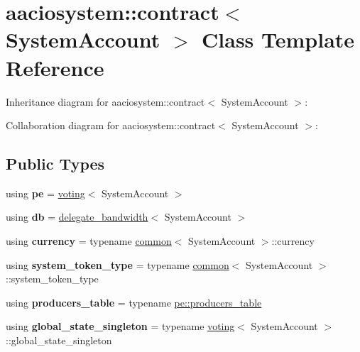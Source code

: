 \hypertarget{classaaciosystem_1_1contract}{}\section{aaciosystem\+:\+:contract$<$ System\+Account $>$ Class Template Reference}
\label{classaaciosystem_1_1contract}


Inheritance diagram for aaciosystem\+:\+:contract$<$ System\+Account $>$\+:


Collaboration diagram for aaciosystem\+:\+:contract$<$ System\+Account $>$\+:
\subsection*{Public Types}
\begin{DoxyCompactItemize}
\item 
\mbox{\label{classaaciosystem_1_1contract_a73765f922ec108eab9396a0bebcc656e}} 
using {\bfseries pe} = \mbox{\hyperlink{classaaciosystem_1_1voting}{voting}}$<$ System\+Account $>$
\item 
\mbox{\label{classaaciosystem_1_1contract_a47b33082aceb4f3932fefbb5cd3ae8bc}} 
using {\bfseries db} = \mbox{\hyperlink{classaaciosystem_1_1delegate__bandwidth}{delegate\+\_\+bandwidth}}$<$ System\+Account $>$
\item 
\mbox{\label{classaaciosystem_1_1contract_aa5cc714086c285dfc9fca04f84438fa4}} 
using {\bfseries currency} = typename \mbox{\hyperlink{classaaciosystem_1_1common}{common}}$<$ System\+Account $>$\+::currency
\item 
\mbox{\label{classaaciosystem_1_1contract_a2796af567387792965785707882ef040}} 
using {\bfseries system\+\_\+token\+\_\+type} = typename \mbox{\hyperlink{classaaciosystem_1_1common}{common}}$<$ System\+Account $>$\+::system\+\_\+token\+\_\+type
\item 
\mbox{\label{classaaciosystem_1_1contract_a0c3c008af33897867d5a736c59f6966c}} 
using {\bfseries producers\+\_\+table} = typename \mbox{\hyperlink{classaacio_1_1multi__index}{pe\+::producers\+\_\+table}}
\item 
\mbox{\label{classaaciosystem_1_1contract_aafa457221a09049b3ded1fb38e888d20}} 
using {\bfseries global\+\_\+state\+\_\+singleton} = typename \mbox{\hyperlink{classaaciosystem_1_1voting}{voting}}$<$ System\+Account $>$\+::global\+\_\+state\+\_\+singleton
\end{DoxyCompactItemize}
